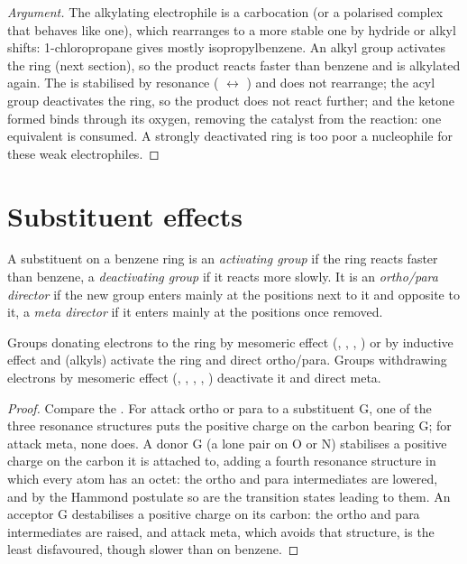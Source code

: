 \begin{proof}[Argument]
The alkylating electrophile is a carbocation (or a polarised complex that behaves like one),
which rearranges to a more stable one by hydride or alkyl shifts: 1-chloropropane gives
mostly isopropylbenzene. An alkyl group activates the ring (next section), so the product
reacts faster than benzene and is alkylated again. The  is stabilised by
resonance ( $\leftrightarrow$ ) and does not rearrange; the acyl group
deactivates the ring, so the product does not react further; and the ketone formed binds
 through its oxygen, removing the catalyst from the reaction: one equivalent is
consumed. A strongly deactivated ring is too poor a nucleophile for these weak electrophiles.
\end{proof}

\section{Substituent effects}

\begin{definition}\label{def:b2:aromatic-substitution:directing}
A substituent on a benzene ring is an \emph{activating group} if the
ring reacts faster than benzene, a \emph{deactivating group} if it
reacts more slowly. It is an \emph{ortho/para director} if the new
group enters mainly at the positions next to it and opposite to it, a \emph{meta
director} if it enters mainly at the positions once removed.
\end{definition}

\begin{proposition}\label{prop:b2:aromatic-substitution:directing}
Groups donating electrons to the ring by mesomeric effect (, , ,
) or by inductive effect and  (alkyls) activate the ring and direct
ortho/para. Groups withdrawing electrons by mesomeric effect (, , ,
, ) deactivate it and direct meta.
\end{proposition}

\begin{proof}
Compare the . For attack ortho or para to a substituent G, one of the
three resonance structures puts the positive charge on the carbon bearing G; for attack meta,
none does. A donor G (a lone pair on O or N) stabilises a positive charge on the carbon it is
attached to, adding a fourth resonance structure in which every atom has an octet: the ortho
and para intermediates are lowered, and by the Hammond postulate so are the transition states
leading to them. An acceptor G destabilises a positive charge on its carbon: the ortho and para
intermediates are raised, and attack meta, which avoids that structure, is the least
disfavoured, though slower than on benzene.
\end{proof}

